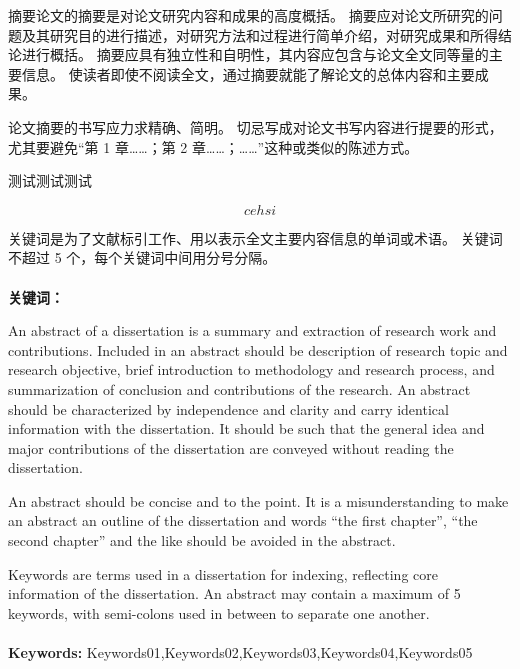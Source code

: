 
\begin{cnabstract} 
  摘要论文的摘要是对论文研究内容和成果的高度概括。
  摘要应对论文所研究的问题及其研究目的进行描述，对研究方法和过程进行简单介绍，对研究成果和所得结论进行概括。
  摘要应具有独立性和自明性，其内容应包含与论文全文同等量的主要信息。
  使读者即使不阅读全文，通过摘要就能了解论文的总体内容和主要成果。

  论文摘要的书写应力求精确、简明。
  切忌写成对论文书写内容进行提要的形式，尤其要避免“第 1 章……；第 2 章……；……”这种或类似的陈述方式。

  测试测试测试
  
  $$ cehsi $$

  关键词是为了文献标引工作、用以表示全文主要内容信息的单词或术语。
  关键词不超过 5 个，每个关键词中间用分号分隔。
 \\
 \\
 \heiti \bfseries{关键词：} 
\end{cnabstract} 
  
\begin{enabstract}
  \par An abstract of a dissertation is a summary and extraction of research work and contributions.
  Included in an abstract should be description of research topic and research objective, brief introduction to methodology and research process, and summarization of conclusion and contributions of the research.
  An abstract should be characterized by independence and clarity and carry identical information with the dissertation.
  It should be such that the general idea and major contributions of the dissertation are conveyed without reading the dissertation.

  An abstract should be concise and to the point.
  It is a misunderstanding to make an abstract an outline of the dissertation and words “the first chapter”, “the second chapter” and the like should be avoided in the abstract.

  Keywords are terms used in a dissertation for indexing, reflecting core information of the dissertation.
  An abstract may contain a maximum of 5 keywords, with semi-colons used in between to separate one another.
  \\
  \\
  \textbf{Keywords:} {Keywords01,Keywords02,Keywords03,Keywords04,Keywords05}
\end{enabstract}
